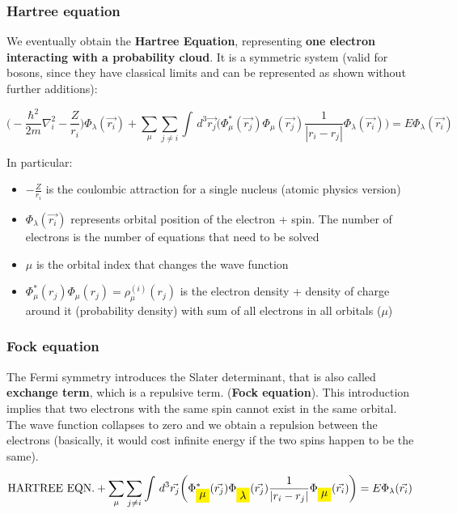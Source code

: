 		\subsubsection{Hartree equation}
		We eventually obtain the \textbf{Hartree Equation}, representing \textbf{one electron interacting with a probability cloud}.
		It is a symmetric system (valid for bosons, since they have classical limits and can be represented as shown without further additions):

		$$\bigg(-\frac{\hbar^2}{2m}\nabla^2_i-\frac{Z}{r_i}\bigg)\Phi_\lambda(\vec{r_i})+\sum_\mu \sum_{j \neq i} \int\,d^3\vec{r_j}\bigg(\Phi^*_\mu(\vec{r_j})\Phi_\mu(\vec{r_j})\frac{1}{|r_i-r_j|}\Phi_\lambda(\vec{r_i})\bigg)=E\Phi_\lambda(\vec{r_i})$$

		In particular:

		\begin{multicols}{2}
			\begin{itemize}
				\item $-\frac{Z}{r_i}$ is the coulombic attraction for a single nucleus (atomic physics version)
				\item $\Phi_\lambda(\vec{r_i})$ represents orbital position of the electron + spin. The number of electrons is the number of equations that need to be solved
				\item $\mu$ is the orbital index that changes the wave function
				\item $\Phi^*_\mu(r_j)\Phi_\mu(r_j) = \rho_\mu^{(i)}(r_j)$ is the electron density + density of charge around it (probability density) with sum of all electrons in all orbitals ($\mu$)
			\end{itemize}
		\end{multicols}

		\subsubsection{Fock equation}
		The Fermi symmetry introduces the Slater determinant, that is also called \textbf{exchange term}, which is a repulsive term. (\textbf{Fock equation}).
		This introduction implies that two electrons with the same spin cannot exist in the same orbital.
		The wave function collapses to zero and we obtain a repulsion between the electrons (basically, it would cost infinite energy if the two spins happen to be the same).

		$$\text{HARTREE EQN.}+\sum_\mu \sum_{j \neq i} \int\,d^3\vec{r_j}\bigg(\Phi^*_{\mathcolorbox{yellow}{\mu}}(\vec{r_j})\Phi_{\mathcolorbox{yellow}{\lambda}}(\vec{r_j})\frac{1}{|r_i-r_j|}\Phi_{\mathcolorbox{yellow}{\mu}}(\vec{r_i})\bigg)=E\Phi_\lambda(\vec{r_i})$$

